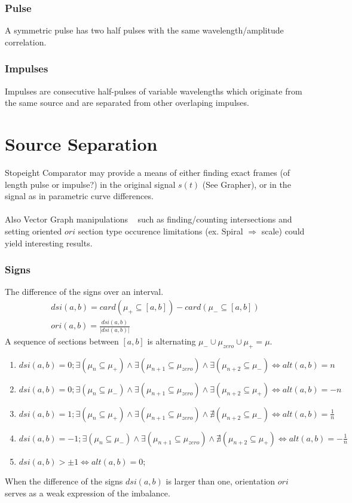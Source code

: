 \documentclass{report}
\begin{document}
\subsection{Pulse}
A symmetric pulse has two half pulses with the same wavelength/amplitude correlation.

\subsection{Impulses}
Impulses are consecutive half-pulses of variable wavelengths which originate from the same source and are separated from other overlaping impulses.

\chapter{Source Separation}
Stopeight Comparator may provide a means of either finding exact frames (of length pulse or impulse?) in the original signal $s(t)$ (See Grapher), or in the signal as in parametric curve differences.\\\\
Also Vector Graph manipulations ~\cite{Analyzer} such as finding/counting intersections and setting oriented $ori$ section type occurence limitations (ex. Spiral $\Rightarrow$ scale) could yield interesting results.

\subsection{Signs}
The difference of the signs over an interval.
\begin{align}
dsi(a,b) = card(\mu_{+}\subseteq [a,b])-card(\mu_{-} \subseteq [a,b])\\
ori(a,b) = \frac{dsi(a,b)}{\lvert dsi(a,b) \rvert}
\end{align}
A sequence of sections between $[a,b]$ is alternating $\mu_{-}\cup \mu_{zero}\cup\mu_{+}=\mu$.
\begin{enumerate}
\item $dsi(a,b)= 0; \exists(\mu_{n}\subseteq \mu_{+}) \land \exists(\mu_{n+1}\subseteq \mu_{zero}) \land \exists(\mu_{n+2}\subseteq \mu_{-}) \Leftrightarrow alt(a,b)=n$
\item $dsi(a,b)= 0; \exists(\mu_{n}\subseteq \mu_{-}) \land \exists(\mu_{n+1}\subseteq \mu_{zero}) \land \exists(\mu_{n+2}\subseteq \mu_{+}) \Leftrightarrow alt(a,b)=-n$
\item $dsi(a,b)= 1; \exists(\mu_{n}\subseteq \mu_{+}) \land \exists(\mu_{n+1}\subseteq \mu_{zero}) \land \nexists(\mu_{n+2}\subseteq \mu_{-}) \Leftrightarrow alt(a,b)=\frac{1}{n}$
\item $dsi(a,b)= -1; \exists(\mu_{n}\subseteq \mu_{-}) \land \exists(\mu_{n+1}\subseteq \mu_{zero}) \land \nexists(\mu_{n+2}\subseteq \mu_{+}) \Leftrightarrow alt(a,b)=-\frac{1}{n}$
\item $dsi(a,b)> \pm 1\Leftrightarrow alt(a,b)=0$;
\end{enumerate}
When the difference of the signs $dsi(a,b)$ is larger than one, orientation $ori$ serves as a weak expression of the imbalance.
\end{document}
